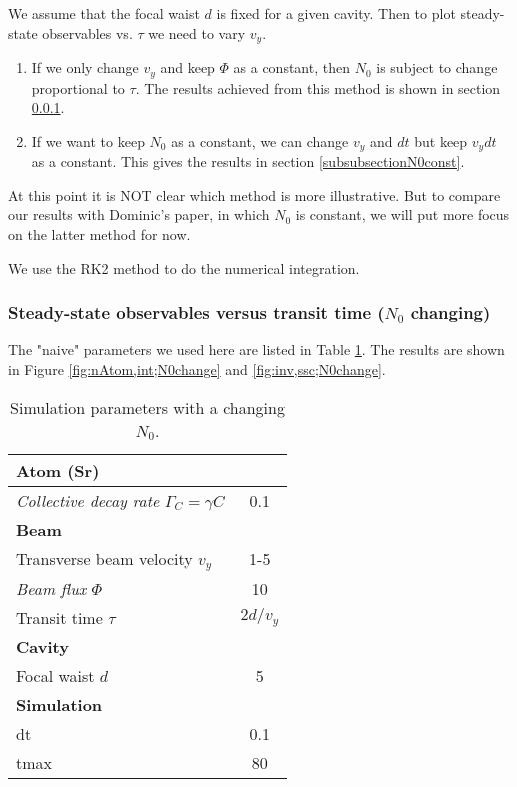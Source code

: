 \documentclass{article}
\newcommand{\gc}{\Gamma_C}
\begin{document}
We assume that the focal waist $d$ is fixed for a given cavity. Then to plot steady-state observables vs. $\tau$ we need to vary $v_y$. 
\begin{enumerate}
    \item If we only change $v_y$ and keep $\Phi$ as a constant, then $N_0$ is subject to change proportional to $\tau$. The results achieved from this method is shown in section \ref{subsubsectionN0change}.
    \item If we want to keep $N_0$ as a constant, we can change $v_y$ and $dt$ but keep $v_ydt$ as a constant. This gives the results in section \ref{subsubsectionN0const}. 
\end{enumerate}
At this point it is NOT clear which method is more illustrative. But to compare our results with Dominic's paper, in which $N_0$ is constant, we will put more focus on the latter method for now. 

We use the RK2 method to do the numerical integration.

\bigskip
\bigskip
\bigskip
\bigskip
\bigskip
\bigskip
\bigskip



\subsubsection{Steady-state observables versus transit time ($N_0$ changing)}
\label{subsubsectionN0change}
 The "naive" parameters we used here are listed in Table \ref{paramN0change}. The results are shown in Figure \ref{fig:nAtom,int;N0change} and \ref{fig:inv,ssc;N0change}.

\begin{table}[!h]
    \centering
    \begin{tabular}{ |l |c|   }
        \hline
        \textbf{Atom (Sr)} & \\\hline
        \textit{Collective decay rate} $\gc = \gamma C$  & 0.1\\\hline
        \textbf{Beam} & \\\hline
        Transverse beam velocity $v_y$ & 1-5\\\hline
        \textit{Beam flux} $\Phi$  & 10\\\hline
        Transit time $\tau$ & $2d/v_y$ \\\hline
        \textbf{Cavity} & \\\hline
        Focal waist $d$  & 5\\\hline
        \textbf{Simulation}&\\\hline
        dt & 0.1\\\hline
        tmax & 80 \\\hline
    \end{tabular}
    \caption{Simulation parameters with a changing $N_0$.}
    \label{paramN0change}
\end{table}
\end{document}
